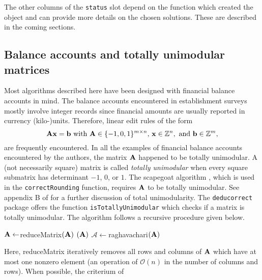 \documentclass[11pt, fleqn, a4paper]{article}
\begin{document}
The other columns of the {\tt status} slot depend on the function which created
the object and can provide more details on the chosen solutions. These are
described in the coming sections.  



\subsection{Balance accounts and totally unimodular matrices}
\label{totallyUnimodularSection}
Most algorithms described here have been designed with financial balance
accounts in mind. The balance accounts encountered in establishment surveys
mostly involve integer records since financial amounts are usually reported in
currency (kilo-)units. Therefore, linear edit rules of the form
%
\begin{equation}
\label{integerRestrictions}
{\bf Ax} = {\bf b} \textrm{ with } {\bf A}\in \{-1,0,1\}^{m\times n}\textrm{, } {\bf x}\in \mathbb{Z}^{n},\textrm{ and } {\bf b}\in\mathbb{Z}^m,
\end{equation}
are frequently encountered. In all the examples of financial balance accounts
encountered by the authors, the matrix $\bf A$ happened to be totally unimodular.
A (not necessarily square) matrix is called {\em totally unimodular} when every
square submatrix has determinant ${-1}$, $0$, or $1$. The scapegoat algorithm
\citep{scholtus:2008}, which is used in the {\tt correctRounding} function,
requires $\bf A$ to be totally unimodular. See appendix B of \cite{scholtus:2008}
for a further discussion of total unimodularity.  The {\tt deducorrect} package
offers the function {\tt isTotallyUnimodular} which checks if a matrix is
totally unimodular. The algorithm follows  a recursive procedure given below.
\begin{algorithmic}[1]
\State ${\bf A}\leftarrow${\sc reduceMatrix}$({\bf A})$
\State{}
\State{}$({\bf A})$
\Else
\State $\mathcal{A} \leftarrow${\sc raghavachari}$({\bf A})$
\State {}
\Else
\State {}
\EndIf
\EndIf
\EndProcedure
\end{algorithmic}
Here, {\sc reduceMatrix} iteratively removes all rows and columns of $\bf A$ which
have at most one nonzero element (an operation of $\mathcal{O}(n)$ in the
number of columns and rows).  When possible, the criterium of
\end{document}
